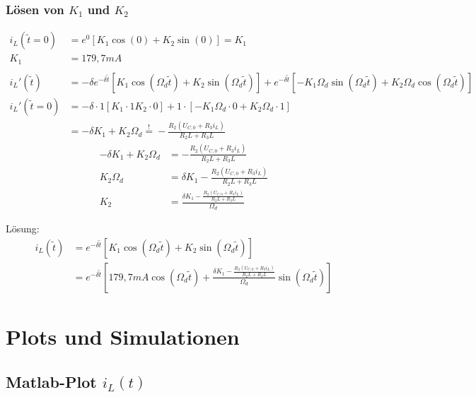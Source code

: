 \documentclass[11pt]{scrartcl}
\begin{document}
\subsubsection{Lösen von $K_1$ und $K_2$}%
\begin{align*}
  i_{L}(\tilde{t} = 0) &= e^{0} \left[ K_{1} \cos(0) + K_{2} \sin(0)\right] = K_{1} \\
  K_{1} &= 179,7 \unit{mA} \\ \\
  i_{L}'(\tilde{t}) &= -\delta e^{-\delta \tilde{t}} \left[ K_{1} \cos(\Omega_{d} \tilde{t}) + K_{2} \sin(\Omega_{d} \tilde{t})\right] + e^{-\delta \tilde{t}} \left[ -K_{1} \Omega_{d} \sin(\Omega_{d} \tilde{t}) + K_{2} \Omega_{d} \cos(\Omega_{d} \tilde{t})\right] \\
  i_{L}'(\tilde{t}=0) &= -\delta\cdot 1 \left[ K_{1}\cdot 1 K_{2} \cdot 0\right] + 1 \cdot \left[ -K_{1}\Omega_{d} \cdot 0 + K_{2} \Omega_{d} \cdot 1\right] \\
  &= -\delta K_{1} + K_{2}\Omega_{d} \overset{!}{=} - \frac{R_{2} (U_{C,0} + R_{3} i_{L})}{R_{2}L + R_{3}L}
\end{align*}
\begin{align*}
  -\delta K_{1} + K_{2}\Omega_{d} &= - \frac{R_{2} (U_{C,0} + R_{3} i_{L})}{R_{2}L + R_{3}L} \\
  K_{2}\Omega_{d} &= \delta K_{1} - \frac{R_{2}(U_{C,0} + R_{3}i_{L})}{R_{2}L + R_{3}L} \\
  K_{2} &= \frac{\delta K_{1} - \frac{R_{2}(U_{C,0} + R_{3} i_{L})}{R_{2}L + R_{3}L}}{\Omega_{d}}
\end{align*}

Lösung:
\begin{align*}
  i_{L}(\tilde{t}) &= e^{-\delta \tilde{t}}\left[ K_{1} \cos(\Omega_{d} \tilde{t}) + K_{2} \sin(\Omega_{d} \tilde{t}) \right] \\
  &= e^{-\delta \tilde{t}}\left[ 179,7 \unit{mA} \cos(\Omega_{d} \tilde{t}) + \frac{\delta K_{1} - \frac{R_{2}(U_{C,0} + R_{3} i_{L})}{R_{2}L + R_{3}L}}{\Omega_{d}} \sin(\Omega_{d} \tilde{t}) \right]
\end{align*}
\section{Plots und Simulationen} %
\subsection{Matlab-Plot $i_L(t)$} %
\end{document}
